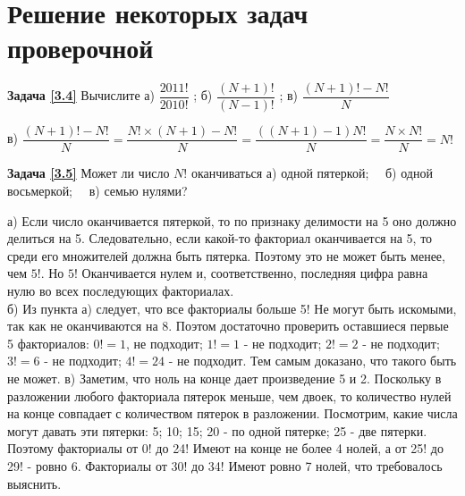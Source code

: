 \section{Решение некоторых задач проверочной}

\textbf{Задача \ref{3.4}}
	Вычислите а) $\dfrac{2011!}{2010!}$ ;  б) $\dfrac{(N+1)!}{(N-1)!}$ ; в)  $\dfrac{(N+1)!-N!}{N}$

\begin{prf}
	в) $\dfrac{(N+1)!-N!}{N}=\dfrac{N!\times (N+1)-N!}{N}=\dfrac{((N+1)-1)N!}{N}=\dfrac{N\times N!}{N}=N! $
\end{prf}

\textbf{Задача \ref{3.5}}
	Может ли число $N!$ оканчиваться а) одной пятеркой;~~ б) одной восьмеркой;~~ в) семью нулями?

\begin{prf}
	а) Если число оканчивается пятеркой, то по признаку делимости на 5 оно должно делиться на 5. Следовательно, если какой-то факториал оканчивается на 5, то среди его множителей должна быть пятерка. Поэтому это не может быть менее, чем $ 5! $. Но $ 5! $ Оканчивается нулем и, соответственно, последняя цифра равна нулю во всех последующих факториалах.\\  б) Из пункта а) следует, что все факториалы больше 5! Не могут быть искомыми, так как не оканчиваются на 8. Поэтом достаточно проверить оставшиеся первые 5 факториалов: $ 0! = 1 $, не подходит; $ 1! = 1 $ - не подходит; $ 2! = 2 $ - не подходит; $ 3! = 6 $ - не подходит; $ 4! = 24 $ - не подходит. Тем самым доказано, что такого быть не может. в) Заметим, что ноль на конце дает произведение 5 и 2. Поскольку в разложении любого факториала пятерок меньше, чем двоек, то количество нулей на конце совпадает с количеством пятерок в разложении. Посмотрим, какие числа могут давать эти пятерки: 5; 10; 15; 20 - по одной пятерке; 25 - две пятерки. Поэтому факториалы от 0! до 24! Имеют на конце не более 4 нолей, а от 25! до 29! - ровно 6. Факториалы от 30! до 34! Имеют ровно 7 нолей, что требовалось выяснить.
\end{prf}